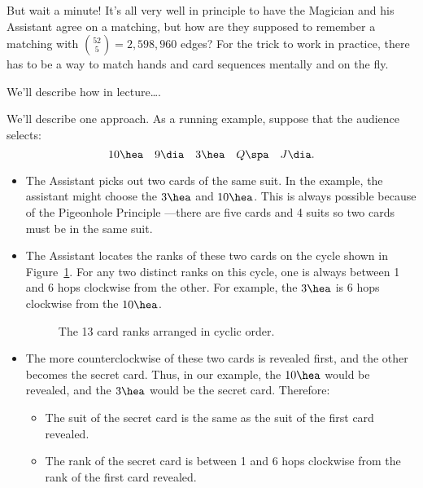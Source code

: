 But wait a minute!  It's all very well in principle to have the Magician
and his Assistant agree on a matching, but how are they supposed to
remember a matching with $\binom{52}{5} = 2,598,960$ edges?  For the trick
to work in practice, there has to be a way to match hands and card
sequences mentally and on the fly.

We'll describe how in lecture\dots.  %

\iffalse %

We'll describe one approach.  As a running example, suppose that the
audience selects:
\[
10 \hea \quad 9 \dia \quad 3 \hea \quad Q \spa \quad J \dia.
\]

\begin{itemize}

\item The Assistant picks out two cards of the same suit.  In the
example, the assistant might choose the $3 \hea$ and $10 \hea$.  This
is always possible because of the Pigeonhole Principle ---there are
five cards and 4 suits so two cards must be in the same suit.

\item The Assistant locates the ranks of these two cards on the cycle
  shown in Figure~\ref{fig:11Q11}. For any two distinct ranks on this
  cycle, one is always between 1 and 6 hops clockwise from the other.
  For example, the $3 \hea$ is 6 hops clockwise from the $10 \hea$.


\begin{figure}


\caption{The 13 card ranks arranged in cyclic order.}

\label{fig:11Q11}

\end{figure}

\item The more counterclockwise of these two cards is revealed first,
and the other becomes the secret card.  Thus, in our example, the $10
\hea$ would be revealed, and the $3 \hea$ would be the secret card.
Therefore:

\begin{itemize}

\item The suit of the secret card is the same as the suit of the first
card revealed.

\item The rank of the secret card is between 1 and 6 hops clockwise
from the rank of the first card revealed.


\end{itemize}
\end{itemize}

